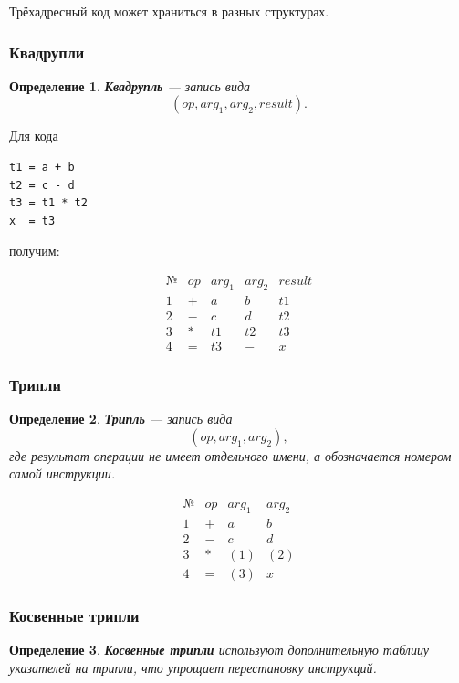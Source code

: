 \documentclass[12pt,a4paper]{article}
\newtheorem{definition}{Определение}
\begin{document}
Трёхадресный код может храниться в разных структурах.

\subsubsection{Квадрупли}

\begin{definition}
\textbf{Квадрупль} --- запись вида
\[
(op, arg_1, arg_2, result).
\]
\end{definition}

Для кода

\begin{lstlisting}
t1 = a + b
t2 = c - d
t3 = t1 * t2
x  = t3
\end{lstlisting}

получим:

\[
\begin{array}{c|c|c|c|c}
№ & op & arg_1 & arg_2 & result \\
\hline
1 & + & a & b & t1 \\
2 & - & c & d & t2 \\
3 & * & t1 & t2 & t3 \\
4 & = & t3 & - & x
\end{array}
\]

\subsubsection{Трипли}

\begin{definition}
\textbf{Трипль} --- запись вида
\[
(op, arg_1, arg_2),
\]
где результат операции не имеет отдельного имени, а обозначается номером самой инструкции.
\end{definition}

\[
\begin{array}{c|c|c|c}
№ & op & arg_1 & arg_2 \\
\hline
1 & + & a & b \\
2 & - & c & d \\
3 & * & (1) & (2) \\
4 & = & (3) & x
\end{array}
\]

\subsubsection{Косвенные трипли}

\begin{definition}
\textbf{Косвенные трипли} используют дополнительную таблицу указателей на трипли, что упрощает перестановку инструкций.
\end{definition}
\end{document}
